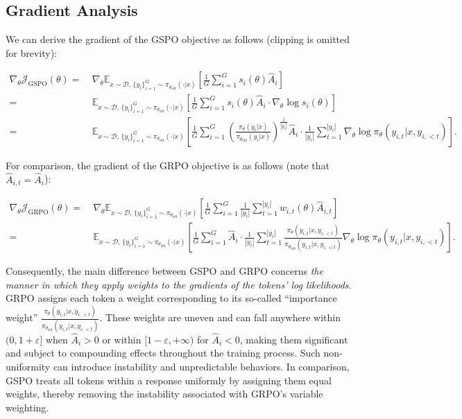 \subsection{Gradient Analysis}
\label{subsec:gradient}

We can derive the gradient of the GSPO objective as follows (clipping is omitted for brevity):

\begin{align}
\nabla_{\theta} \mathcal{J}_\text{GSPO} (\theta)
=&\ 
\nabla_{\theta} \mathbb{E}_{ x \sim \mathcal{D},\, \{y_i\}_{i=1}^G \sim \pi_{\theta_\text{old}}( \cdot | x) }
\left[ 
\frac{1}{G} \sum_{i=1}^{G} s_{i}(\theta) \widehat{A}_{i}
\right] \\
= &\ 
\mathbb{E}_{ x \sim \mathcal{D},\, \{y_i\}_{i=1}^G \sim \pi_{\theta_\text{old}}( \cdot | x) }
\left[ 
\frac{1}{G} \sum_{i=1}^{G}
s_{i}(\theta) \widehat{A}_{i}
\cdot \nabla_{\theta} \log s_{i}(\theta)
\right] \\
=&\ 
\mathbb{E}_{ x \sim \mathcal{D},\, \{y_i\}_{i=1}^G \sim \pi_{\theta_\text{old}}( \cdot | x) }
\left[ 
\frac{1}{G} \sum_{i=1}^{G} 
\left( \frac{ \pi_{\theta} (y_i | x) }{ \pi_{\theta_\text{old}} (y_i | x)} \right)^{\frac{1}{|y_i|}} \widehat{A}_{i} 
\cdot \frac{1}{|y_i|} \sum_{t=1}^{|y_i|} \nabla_{\theta} \log \pi_{\theta} (y_{i,t} | x, y_{i,<t}) 
\right].
\label{equ:gspo_grad}
\end{align}

For comparison, the gradient of the GRPO objective is as follows (note that $\widehat{A}_{i,t} = \widehat{A}_{i}$):

\begin{align}
\nabla_{\theta} \mathcal{J}_\text{GRPO} (\theta) 
=&\ 
\nabla_{\theta} \mathbb{E}_{ x \sim \mathcal{D},\, \{y_i\}_{i=1}^G \sim \pi_{\theta_\text{old}}( \cdot | x) }
\left[ \frac{1}{G} \sum_{i=1}^{G} \frac{1}{|y_i|} \sum_{t=1}^{|y_i|} 
w_{i,t}(\theta) \widehat{A}_{i,t}
\right] \\
=&\
\mathbb{E}_{ x \sim \mathcal{D},\, \{y_i\}_{i=1}^G \sim \pi_{\theta_\text{old}}( \cdot | x) }
\left[ \frac{1}{G} \sum_{i=1}^{G} \widehat{A}_{i} 
\cdot \frac{1}{|y_i|} \sum_{t=1}^{|y_i|} 
\frac{ \pi_{\theta} (y_{i,t} | x, y_{i,<t}) }{ \pi_{\theta_\text{old}} (y_{i,t} | x,y_{i,<t})} 
\nabla_{\theta} \log \pi_{\theta} (y_{i,t} | x, y_{i,<t})  
\right].
\end{align}

Consequently, the main difference between GSPO and GRPO concerns \textit{the manner in which they apply weights to the gradients of the tokens’ log likelihoods}. GRPO assigns each token a weight corresponding to its so-called ``importance weight'' $\frac{ \pi_{\theta} (y_{i,t} | x, y_{i,<t}) }{ \pi_{\theta_\text{old}} (y_{i,t} | x,y_{i,<t})}$. These weights are uneven and can fall anywhere within $(0, 1+\varepsilon]$ when $\widehat{A}_{i} > 0$ or within $[1-\varepsilon, +\infty)$ for $\widehat{A}_{i} < 0$, making them significant and subject to compounding effects throughout the training process. Such non-uniformity can introduce instability and unpredictable behaviors. In comparison, GSPO treats all tokens within a response uniformly by assigning them equal weights, thereby removing the instability associated with GRPO’s variable weighting.

